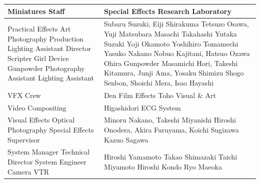 \documentclass{article}
\begin{document}
\begin{tabular}{ll}
\toprule
Miniatures Staff & Special Effects Research Laboratory \\
\midrule
Practical Effects Art Photography Production Lighting Assistant Director Scripter Girl Device Gunpowder Photography Assistant Lighting Assistant & Subaru Suzuki, Eiji Shirakuma Tetsuzo Osawa, Yuji Matsubara Masachi Takahashi Yutaka Suzuki Yoji Okamoto Yoshihiro Tomamechi Yasuko Nakano Nobuo Kajitani, Hatsuo Ozawa Ohira Gunpowder Masamichi Hori, Takeshi Kitamura, Junji Ama, Yosaku Shimizu Shogo Senbon, Shoichi Mera, Isao Hayashi \\
VFX Crew & Den Film Effects Toho Visual \& Art \\
Video Compositing & Higashidori ECG System \\
Visual Effects Optical Photography Special Effects Supervisor & Minoru Nakano, Takeshi Miyanishi Hiroshi Onodera, Akira Furuyama, Koichi Sugizawa Kazuo Sagawa \\
System Manager Technical Director System Engineer Camera VTR & Hiroshi Yamamoto Takao Shimazaki Taichi Miyamoto Hiroshi Kondo Ryo Maeoka \\
\bottomrule
\end{tabular}
\end{document}
